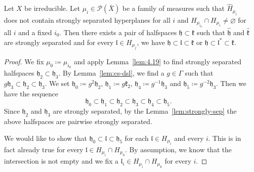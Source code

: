 \begin{lemma}[{\cite[Lemma~4.20]{MR3509968}}]
  \label{lem:4.20}
  Let \(X\) be irreducible. Let \(\mu_i \in \mathcal{P}(\bar X)\) be a family of measures such that \(\hat H_{\mu_i}\) does not contain strongly separated hyperplanes for all \(i\) and \(H_{\mu_{i_0}} \cap H_{\mu_i} \neq \varnothing\) for all \(i\) and a fixed \(i_0\). Then there exists a pair of halfspaces \(\mathfrak{h} \subset \mathfrak{k}\) such that \(\mathfrak{\hat h}\) and \(\mathfrak{\hat k}\) are strongly separated and for every \(\mathfrak{l} \in H_{\mu_j}\), we have \(\mathfrak{h} \subset \mathfrak{l} \subset \mathfrak{k}\) or \(\mathfrak{h} \subset \mathfrak{l}^\ast \subset \mathfrak{k}\).
\end{lemma}

\begin{proof}
  We fix \(\mu_0\coloneqq \mu_{i_0}\) and apply Lemma~\ref{lem:4.19} to find strongly separated halfspaces \(\mathfrak{h_2} \subset \mathfrak{h_3}\). By Lemma~\ref{lem:cs-dsl}, we find a \(g \in \Gamma\) such that \(g\mathfrak{h}_3 \subset \mathfrak{h}_2 \subset \mathfrak{h}_3\). We set \(\mathfrak{h}_0 \coloneqq g^2 \mathfrak{h}_2\), \(\mathfrak{h}_1 \coloneqq g\mathfrak{k}_2\), \(\mathfrak{h}_4 \coloneqq g^{-1}\mathfrak{h}_3\) and \(\mathfrak{h}_5 \coloneqq g^{-2} \mathfrak{h}_3\). Then we have the sequence
  \[
    \mathfrak{h}_0 \subset \mathfrak{h}_1 \subset \mathfrak{h}_2 \subset \mathfrak{h}_3 \subset \mathfrak{h}_4 \subset \mathfrak{h}_5.
  \]
  Since \(\mathfrak{h}_2\) and \(\mathfrak{h}_3\) are strongly separated, by the Lemma~\ref{lem:strongly-sep} the above halfspaces are pairwise strongly separated.

  We would like to show that \(\mathfrak{h}_0 \subset \mathfrak{l} \subset \mathfrak{h}_5\) for each \(\mathfrak{l} \in H_{\mu_i}\) and every \(i\). This is in fact already true for every \(\mathfrak{l} \in H_{\mu_i} \cap H_{\mu_0}\). By assumption, we know that the intersection is not empty and we fix a \(\mathfrak{l}_i \in H_{\mu_i} \cap H_{\mu_0}\) for every \(i\).


\end{proof}
